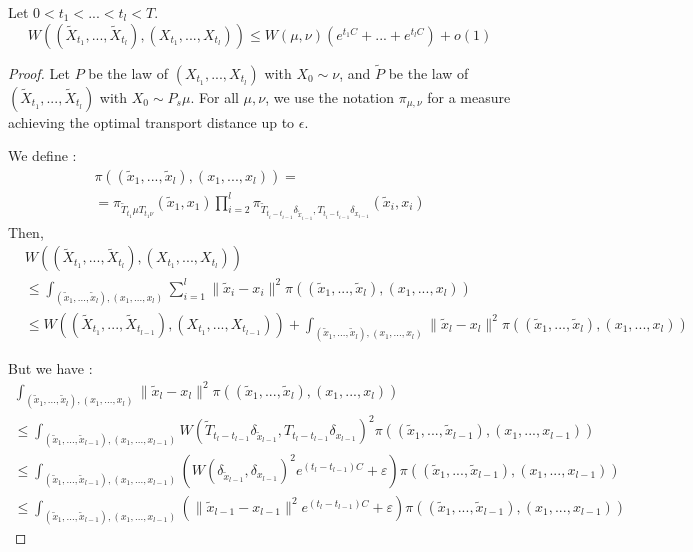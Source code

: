 \documentclass{article}
\begin{document}
\begin{lemma}
  Let $0 < t_{1} < ... < t_{l}<T$.
  \begin{equation}
    W((\tilde X_{t_{1}}, ..., \tilde X_{t_{l}}), (X_{t_{1}}, ..., X_{t_{l}})) \leq W(\mu,\nu)(e^{t_{1}C}+...+e^{t_{l}C}) + o(1)
  \end{equation}
\end{lemma}

\begin{proof}
  Let $P$ be the law of $(X_{t_{1}}, ..., X_{t_{l}})$ with $X_{0} \sim \nu$, and $\tilde P$ be the law of $(\tilde X_{t_{1}}, ..., \tilde X_{t_{l}})$ with $X_{0} \sim P_{s}\mu$.
  For all $\mu, \nu$, we use the notation $\pi_{\mu,\nu}$ for a measure achieving the optimal transport distance up to $\epsilon$.

  We define :
  \begin{align}
    \pi((\tilde x_{1},..., \tilde x_{l}), (x_{1}, ..., x_{l})) = \\ = \pi_{\tilde T_{t_{1}}\mu T_{t_{1}\nu}}(\tilde x_{1}, x_{1})\prod_{i=2}^{l}\pi_{\tilde T_{t_{i}-t_{i-1}}\delta_{\tilde x_{i-1}}, T_{t_{i}-t_{i-1}}\delta_{x_{i-1}}}(\tilde x_{i}, x_{i})
  \end{align}
  Then,
  \begin{align}
    & W((\tilde X_{t_{1}}, ..., \tilde X_{t_{l}}), (X_{t_{1}}, ..., X_{t_{l}}))
    \\ & \leq \int_{(\tilde x_{1},..., \tilde x_{l}), (x_{1},..., x_{l})}\sum_{i=1}^{l}\|\tilde x_{i} - x_{i}\|^{2}\pi((\tilde x_{1},..., \tilde x_{l}), (x_{1}, ..., x_{l}))
         \\ &\leq  W((\tilde X_{t_{1}}, ..., \tilde X_{t_{l-1}}), (X_{t_{1}}, ..., X_{t_{l-1}})) + \int_{(\tilde x_{1},..., \tilde x_{l}), (x_{1},..., x_{l})}\|\tilde x_{l} - x_{l}\|^{2}\pi((\tilde x_{1},..., \tilde x_{l}), (x_{1}, ..., x_{l}))
  \end{align}

  But we have :
  \begin{align}
    \int_{(\tilde x_{1},..., \tilde x_{l}), (x_{1},..., x_{l})}\|\tilde x_{l} - x_{l}\|^{2}\pi((\tilde x_{1},..., \tilde x_{l}), (x_{1}, ..., x_{l}))  \\
    \leq \int_{(\tilde x_{1},..., \tilde x_{l-1}), (x_{1},..., x_{l-1})}W(\tilde T_{t_{l}-t_{l-1}}\delta_{\tilde x_{l-1}}, T_{t_{l}-t_{l-1}}\delta_{x_{l-1}})^{2}\pi((\tilde x_{1},..., \tilde x_{l-1}), (x_{1}, ..., x_{l-1}))\\
    \leq \int_{(\tilde x_{1},..., \tilde x_{l-1}), (x_{1},..., x_{l-1})}(W(\delta_{\tilde x_{l-1}}, \delta_{x_{l-1}})^{2}e^{(t_{l}-t_{l-1})C}+\varepsilon)\pi((\tilde x_{1},..., \tilde x_{l-1}), (x_{1}, ..., x_{l-1}))\\
    \leq \int_{(\tilde x_{1},..., \tilde x_{l-1}), (x_{1},..., x_{l-1})}(\|\tilde x_{l-1} - x_{l-1}\|^{2}e^{(t_{l}-t_{l-1})C}+\varepsilon)\pi((\tilde x_{1},..., \tilde x_{l-1}), (x_{1}, ..., x_{l-1}))
  \end{align}
  

\end{proof}
\end{document}
